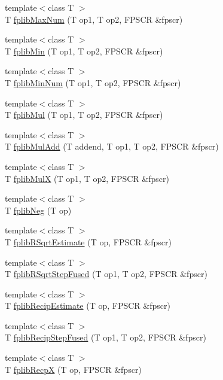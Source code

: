 \begin{DoxyCompactItemize}
{\footnotesize template$<$class T $>$ }\\T \hyperlink{namespaceArmISA_a6e2ac16cb240b3fb44750b434c96d3dc}{fplibMaxNum} (T op1, T op2, FPSCR \&fpscr)
\item 
{\footnotesize template$<$class T $>$ }\\T \hyperlink{namespaceArmISA_a67beae0f92dc6bcb3cd1c38d26265390}{fplibMin} (T op1, T op2, FPSCR \&fpscr)
\item 
{\footnotesize template$<$class T $>$ }\\T \hyperlink{namespaceArmISA_a0603d9eb4ccf0dc512e43adb6f4649c1}{fplibMinNum} (T op1, T op2, FPSCR \&fpscr)
\item 
{\footnotesize template$<$class T $>$ }\\T \hyperlink{namespaceArmISA_a174265ad6a6053a7da475ad194bd2c0f}{fplibMul} (T op1, T op2, FPSCR \&fpscr)
\item 
{\footnotesize template$<$class T $>$ }\\T \hyperlink{namespaceArmISA_a6a5b0d51e8d25a3473e402f4d1ed325c}{fplibMulAdd} (T addend, T op1, T op2, FPSCR \&fpscr)
\item 
{\footnotesize template$<$class T $>$ }\\T \hyperlink{namespaceArmISA_a18f7fa6967a9f299c8a1f6f3c7744c0a}{fplibMulX} (T op1, T op2, FPSCR \&fpscr)
\item 
{\footnotesize template$<$class T $>$ }\\T \hyperlink{namespaceArmISA_aac4fe516ce5f34eea0b52c2699653787}{fplibNeg} (T op)
\item 
{\footnotesize template$<$class T $>$ }\\T \hyperlink{namespaceArmISA_a4beff8d3fe80e352c5c2c5140464a764}{fplibRSqrtEstimate} (T op, FPSCR \&fpscr)
\item 
{\footnotesize template$<$class T $>$ }\\T \hyperlink{namespaceArmISA_a8cb7f151ff242af9be800dc20581efa0}{fplibRSqrtStepFused} (T op1, T op2, FPSCR \&fpscr)
\item 
{\footnotesize template$<$class T $>$ }\\T \hyperlink{namespaceArmISA_acdf022cf0182b670183c7e784ee9ab4d}{fplibRecipEstimate} (T op, FPSCR \&fpscr)
\item 
{\footnotesize template$<$class T $>$ }\\T \hyperlink{namespaceArmISA_a723e6dd081ffeae26d68f3a337e6b613}{fplibRecipStepFused} (T op1, T op2, FPSCR \&fpscr)
\item 
{\footnotesize template$<$class T $>$ }\\T \hyperlink{namespaceArmISA_a8b97f022fbe4068ed0ac1aee8bbabc03}{fplibRecpX} (T op, FPSCR \&fpscr)

\end{DoxyCompactItemize}
